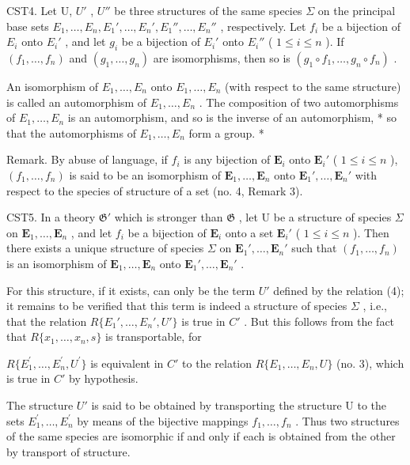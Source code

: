 CST4. Let U, \(U'\) , \(U''\) be three structures of the same species \(\Sigma\) on the principal base sets \(E_{1}, \ldots, E_{n}, E_{1}', \ldots, E_{n}', E_{1}'', \ldots, E_{n}''\) , respectively. Let \(f_{i}\) be a bijection of \(E_{i}\) onto \(E_{i}'\) , and let \(g_{i}\) be a bijection of \(E_{i}'\) onto \(E_{i}''\) ( \(1 \leqslant i \leqslant n\) ). If \((f_{1}, \ldots, f_{n})\) and \((g_{1}, \ldots, g_{n})\) are isomorphisms, then so is \((g_{1} \circ f_{1}, \ldots, g_{n} \circ f_{n})\) .

An isomorphism of \(E_{1}, \ldots, E_{n}\) onto \(E_{1}, \ldots, E_{n}\) (with respect to the same structure) is called an automorphism of \(E_{1}, \ldots, E_{n}\) . The composition of two automorphisms of \(E_{1}, \ldots, E_{n}\) is an automorphism, and so is the inverse of an automorphism, * so that the automorphisms of \(E_{1}, \ldots, E_{n}\) form a group. *

Remark. By abuse of language, if \(f_{i}\) is any bijection of \(\mathbf{E}_i\) onto \(\mathbf{E}_i'\) ( \(1 \leqslant i \leqslant n\) ), \((f_1, \ldots, f_n)\) is said to be an isomorphism of \(\mathbf{E}_1, \ldots, \mathbf{E}_n\) onto \(\mathbf{E}_1', \ldots, \mathbf{E}_n'\) with respect to the species of structure of a set (no. 4, Remark 3).

CST5. In a theory \(\mathfrak{G}'\) which is stronger than \(\mathfrak{G}\) , let U be a structure of species \(\Sigma\) on \(\mathbf{E}_1, \ldots, \mathbf{E}_n\) , and let \(f_i\) be a bijection of \(\mathbf{E}_i\) onto a set \(\mathbf{E}_i'\) ( \(1 \leqslant i \leqslant n\) ). Then there exists a unique structure of species \(\Sigma\) on \(\mathbf{E}_1', \ldots, \mathbf{E}_n'\) such that \((f_1, \ldots, f_n)\) is an isomorphism of \(\mathbf{E}_1, \ldots, \mathbf{E}_n\) onto \(\mathbf{E}_1', \ldots, \mathbf{E}_n'\) .

For this structure, if it exists, can only be the term \(U'\) defined by the relation (4); it remains to be verified that this term is indeed a structure of species \(\Sigma\) , i.e., that the relation \(R\{E_{1}', \ldots, E_{n}', U'\}\) is true in \(C'\) . But this follows from the fact that \(R\{x_{1}, \ldots, x_{n}, s\}\) is transportable, for

\(R\{E_{1}^{\prime},\ldots,E_{n}^{\prime},U^{\prime}\}\) is equivalent in \(C'\) to the relation \(R\{E_{1},\ldots,E_{n},U\}\) (no. 3), which is true in \(C'\) by hypothesis.

The structure \(U'\) is said to be obtained by transporting the structure U to the sets \(E_{1}^{\prime}, \ldots, E_{n}^{\prime}\) by means of the bijective mappings \(f_{1}, \ldots, f_{n}\) . Thus two structures of the same species are isomorphic if and only if each is obtained from the other by transport of structure.

